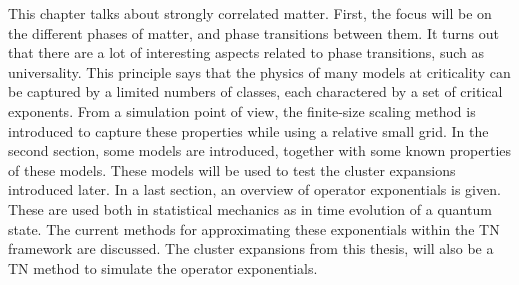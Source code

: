 This chapter talks about strongly correlated matter. First, the focus will be on the different phases of matter, and phase transitions between them. It turns out that there are a lot of interesting aspects related to phase transitions, such as universality. This principle says that the physics of many models at criticality can be captured by a limited numbers of classes, each charactered by a set of critical exponents. From a simulation point of view, the finite-size scaling method is introduced to capture these properties while using a relative small grid.
In the second section, some models are introduced, together with some known properties of these models. These models will be used to test the cluster expansions introduced later.
In a last section, an overview of operator exponentials is given. These are used both in statistical mechanics as in time evolution of a quantum state. The current methods for approximating these exponentials within the \Gls{TN} framework are discussed. The cluster expansions from this thesis, will also be a \Gls{TN} method to simulate the operator exponentials.
